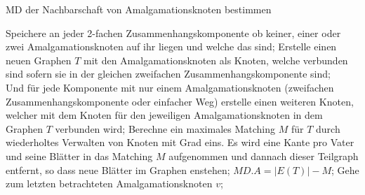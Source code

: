\begin{algorithm}
\caption{MD der Nachbarschaft von Amalgamationsknoten bestimmen}
\begin{algorithmic}[1]
\vspace{2mm}
\ENDFOR
\STATE Speichere an jeder 2-fachen Zusammenhangskomponente ob keiner, einer oder zwei Amalgamationsknoten auf ihr liegen und welche das sind; 
\STATE Erstelle einen neuen Graphen $T$ mit den Amalgamationsknoten als Knoten, welche verbunden sind sofern sie in der gleichen zweifachen Zusammenhangskomponente sind;\\
\STATE Und für jede Komponente mit nur einem Amalgamationsknoten (zweifachen Zusammenhangskomponente oder einfacher Weg) erstelle einen weiteren Knoten, welcher mit dem Knoten für den jeweiligen Amalgamationsknoten in dem Graphen $T$ verbunden wird;
\STATE Berechne ein maximales Matching $M$ für $T$ durch wiederholtes Verwalten von Knoten mit Grad eins. Es wird eine Kante pro Vater und seine Blätter in das Matching $M$ aufgenommen und dannach dieser Teilgraph entfernt, so dass neue Blätter im Graphen enstehen;
\STATE $MD.A=|E(T)|-M$;
\STATE Gehe zum letzten betrachteten Amalgamationsknoten $v$;
\ENDIF
{}
\ENDFOR
\end{algorithmic}
\label{algsonderfall2}
\end{algorithm}

